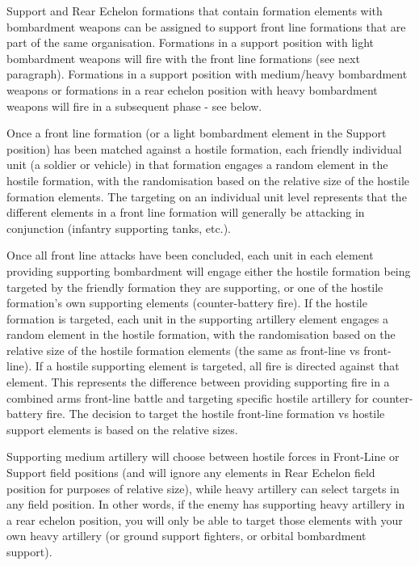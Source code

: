 \documentclass[../../Aurora C# unofficial manual.tex]{subfiles}
\begin{document}
	Support and Rear Echelon formations that contain formation elements with bombardment weapons can be assigned to support front line formations that are part of the same organisation. Formations in a support position with light bombardment weapons will fire with the front line formations (see next paragraph). Formations in a support position with medium/heavy bombardment weapons or formations in a rear echelon position with heavy bombardment weapons will fire in a subsequent phase - see below.
	
	Once a front line formation (or a light bombardment element in the Support position) has been matched against a hostile formation, each friendly individual unit (a soldier or vehicle) in that formation engages a random element in the hostile formation, with the randomisation based on the relative size of the hostile formation elements. The targeting on an individual unit level represents that the different elements in a front line formation will generally be attacking in conjunction (infantry supporting tanks, etc.).
	
	Once all front line attacks have been concluded, each unit in each element providing supporting bombardment will engage either the hostile formation being targeted by the friendly formation they are supporting, or one of the hostile formation's own supporting elements (counter-battery fire). If the hostile formation is targeted, each unit in the supporting artillery element engages a random element in the hostile formation, with the randomisation based on the relative size of the hostile formation elements (the same as front-line vs front-line). If a hostile supporting element is targeted, all fire is directed against that element. This represents the difference between providing supporting fire in a combined arms front-line battle and targeting specific hostile artillery for counter-battery fire. The decision to target the hostile front-line formation vs hostile support elements is based on the relative sizes.
	
	Supporting medium artillery will choose between hostile forces in Front-Line or Support field positions (and will ignore any elements in Rear Echelon field position for purposes of relative size), while heavy artillery can select targets in any field position. In other words, if the enemy has supporting heavy artillery in a rear echelon position, you will only be able to target those elements with your own heavy artillery (or ground support fighters, or orbital bombardment support).
	
\end{document}
